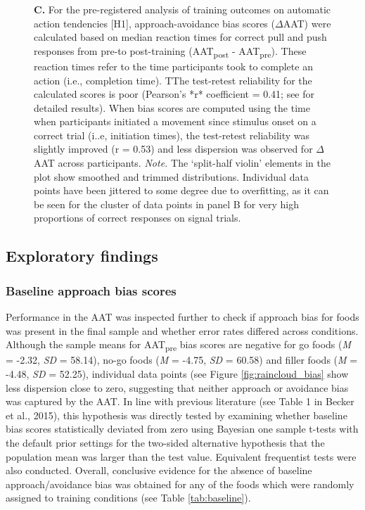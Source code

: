 \documentclass[man,floatsintext]{apa6}
\begin{document}
\begin{figure}
    \ContinuedFloat
    \captionsetup{labelformat=empty}
    \caption{\textbf{C.} For the pre-registered analysis of training outcomes on automatic action tendencies [H1], approach-avoidance bias scores ($\Delta$AAT) were calculated based on median reaction times for correct pull and push responses from pre-to post-training (AAT\textsubscript{post} - AAT\textsubscript{pre}). These reaction times refer to the time participants took to complete an action (i.e., completion time). TThe test-retest reliability for the calculated scores is poor (Pearson’s *r* coefficient = 0.41; see \textit{} for detailed results). When bias scores are computed using the time when participants initiated a movement since stimulus onset on a correct trial (i..e, initiation times), the test-retest reliability was slightly improved (r = 0.53) and less dispersion was observed for $\Delta$AAT across participants. \textit{Note.} The `split-half violin' elements in the plot show smoothed and trimmed distributions. Individual data points have been jittered  to some degree due to overfitting, as it can be seen for the cluster of data points in panel B for very high proportions of correct responses on signal trials.}
\end{figure}

\hypertarget{exploratory-findings}{%
\subsection{Exploratory findings}\label{exploratory-findings}}

\hypertarget{baseline_bias}{%
\subsubsection{Baseline approach bias scores}\label{baseline_bias}}

Performance in the AAT was inspected further to check if approach bias for foods was present in the final sample and whether error rates differed across conditions. Although the sample means for AAT\textsubscript{pre} bias scores are negative for go foods (\emph{M} = -2.32, \emph{SD} = 58.14), no-go foods (\emph{M} = -4.75, \emph{SD} = 60.58) and filler foods (\emph{M} = -4.48, \emph{SD} = 52.25), individual data points (see Figure \ref{fig:raincloud_bias} show less dispersion close to zero, suggesting that neither approach or avoidance bias was captured by the AAT. In line with previous literature (see Table 1 in Becker et al., 2015), this hypothesis was directly tested by examining whether baseline bias scores statistically deviated from zero using Bayesian one sample t-tests with the default prior settings for the two-sided alternative hypothesis that the population mean was larger than the test value. Equivalent frequentist tests were also conducted. Overall, conclusive evidence for the absence of baseline approach/avoidance bias was obtained for any of the foods which were randomly assigned to training conditions (see Table \ref{tab:baseline}).
\end{document}
